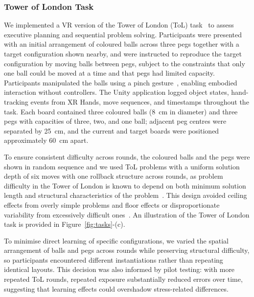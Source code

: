 \subsubsection{Tower of London Task}
We implemented a VR version of the Tower of London (ToL) task~\citep{shallice1982specific} to assess executive planning and sequential problem solving. Participants were presented with an initial arrangement of coloured balls across three pegs together with a target configuration shown nearby, and were instructed to reproduce the target configuration by moving balls between pegs, subject to the constraints that only one ball could be moved at a time and that pegs had limited capacity. Participants manipulated the balls using a pinch gesture~\citep{mikkelsen2025dof}, enabling embodied interaction without controllers. The Unity application logged object states, hand-tracking events from XR Hands, move sequences, and timestamps throughout the task. Each board contained three coloured balls (8~cm in diameter) and three pegs with capacities of three, two, and one ball; adjacent peg centres were separated by 25~cm, and the current and target boards were positioned approximately 60~cm apart. 

To ensure consistent difficulty across rounds, the coloured balls and the pegs were shown in random sequence and we used ToL problems with a uniform solution depth of six moves with one rollback structure across rounds, as problem difficulty in the Tower of London is known to depend on both minimum solution length and structural characteristics of the problem~\citep{kaller2004impact}. This design avoided ceiling effects from overly simple problems and floor effects or disproportionate variability from excessively difficult ones~\citep{kaller2012assessing}. An illustration of the Tower of London task is provided in Figure~\ref{fig:tasks}-(c).

To minimise direct learning of specific configurations, we varied the spatial arrangement of balls and pegs across rounds while preserving structural difficulty, so participants encountered different instantiations rather than repeating identical layouts. This decision was also informed by pilot testing: with more repeated ToL rounds, repeated exposure substantially reduced errors over time, suggesting that learning effects could overshadow stress-related differences.

